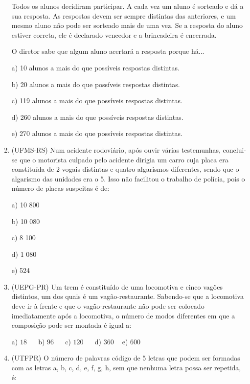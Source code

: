\begin{multicols*}{2}
\begin{enumerate}
              Todos os alunos decidiram participar. A cada vez um aluno é sorteado e dá a sua resposta. As respostas devem ser sempre distintas das anteriores, e um mesmo aluno não pode ser sorteado mais de uma vez. Se a resposta do aluno estiver correta, ele é declarado vencedor e a brincadeira é encerrada.

              O diretor sabe que algum aluno acertará a resposta porque há...

              a) 10 alunos a mais do que possíveis respostas distintas.

              b) 20 alunos a mais do que possíveis respostas distintas.

              c) 119 alunos a mais do que possíveis respostas distintas.

              d) 260 alunos a mais do que possíveis respostas distintas.

              e) 270 alunos a mais do que possíveis respostas distintas.

        \item (UFMS-RS) Num acidente rodoviário, após ouvir várias testemunhas, conclui-se que o motorista culpado pelo acidente dirigia um carro cuja placa era constituída de 2 vogais distintas e quatro algarismos diferentes, sendo que o algarismo das unidades era o 5. Isso não facilitou o trabalho de polícia, pois o número de placas suspeitas é de:

              a) 10 800

              b) 10 080

              c) 8 100

              d) 1 080

              e) 524

        \item (UEPG-PR) Um trem é constituído de uma locomotiva e cinco vagões distintos, um dos quais é um vagão-restaurante. Sabendo-se que a locomotiva deve ir à frente e que o vagão-restaurante não pode ser colocado imediatamente após a locomotiva, o número de modos diferentes em que a composição pode ser montada é igual a:

              a) $18 \ \ \ \ \ \ $ b) $96 \ \ \ \ \ \ $ c) $120 \ \ \ \ \ \ $ d) $360 \ \ \ \ $ e) $600 \ \ $

        \item (UTFPR) O número de palavras código de 5 letras que podem ser formadas com as letras a, b, c, d, e, f, g, h, sem que nenhuma letra possa ser repetida, é:


\end{enumerate}
\end{multicols*}
